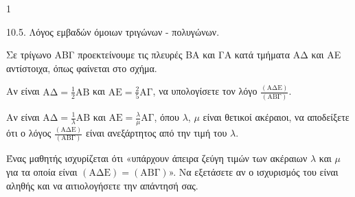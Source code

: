 \begin{ylh}{1}
    \item 10.5. Λόγος εμβαδών όμοιων τριγώνων - πολυγώνων.
\end{ylh}
\begin{figure}
\centering
{}
\end{figure}


Σε τρίγωνο ΑΒΓ προεκτείνουμε τις πλευρές ΒΑ και ΓΑ κατά τμήματα ΑΔ και ΑΕ αντίστοιχα, όπως φαίνεται στο σχήμα.
\begin{alist}
\item Αν είναι $\text{ΑΔ} = \frac{1}{2}\text{ΑΒ}$ και $\text{ΑΕ} = \frac{2}{5}\text{ΑΓ}$, να υπολογίσετε τον λόγο $\frac{(\text{ΑΔΕ})}{(\text{ΑΒΓ})}$. 
\item Αν είναι $\text{ΑΔ} = \frac{1}{\lambda}\text{ΑΒ}$ και $\text{ΑΕ} = \frac{\lambda}{\mu}\text{ΑΓ}$, όπου $\lambda$, $\mu$ είναι θετικοί ακέραιοι, να αποδείξετε ότι ο λόγος $\frac{(\text{ΑΔΕ})}{(\text{ΑΒΓ})}$ είναι ανεξάρτητος από την τιμή του $\lambda$. 
\item Ένας μαθητής ισχυρίζεται ότι «υπάρχουν άπειρα ζεύγη τιμών των ακέραιων $\lambda$ και $\mu$ για τα οποία είναι $(\text{ΑΔΕ}) = (\text{ΑΒΓ})$». Να εξετάσετε αν ο ισχυρισμός του είναι αληθής και να αιτιολογήσετε την απάντησή σας. 
\end{alist}